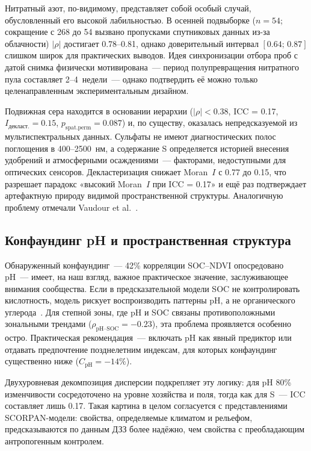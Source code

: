 Нитратный азот, по-видимому, представляет собой особый случай, обусловленный его высокой лабильностью. В осенней подвыборке ($n = 54$; сокращение с 268 до 54 вызвано пропусками спутниковых данных из-за облачности) $|\rho|$ достигает 0.78--0.81, однако доверительный интервал $[0.64;\, 0.87]$ слишком широк для практических выводов. Идея синхронизации отбора проб с датой снимка физически мотивирована~--- период полупревращения нитратного пула составляет 2--4~недели~--- однако подтвердить её можно только целенаправленным экспериментальным дизайном.

Подвижная сера находится в основании иерархии ($|\rho| < 0.38$, ICC = 0.17, $I_{\text{декласт.}} = 0.15$, $p_{\text{spat.perm}} = 0.087$) и, по существу, оказалась непредсказуемой из мультиспектральных данных. Сульфаты не имеют диагностических полос поглощения в 400--2500~нм, а содержание S определяется историей внесения удобрений и атмосферными осаждениями~--- факторами, недоступными для оптических сенсоров. Декластеризация снижает Moran~$I$ с 0.77 до 0.15, что разрешает парадокс «высокий Moran~$I$ при ICC = 0.17» и ещё раз подтверждает артефактную природу видимой пространственной структуры. Аналогичную проблему отмечали Vaudour et al.~\citep{Vaudour2019}.

\subsection{Конфаундинг pH и пространственная структура}

Обнаруженный конфаундинг~--- 42\% корреляции SOC--NDVI опосредовано pH~--- имеет, на наш взгляд, важное практическое значение, заслуживающее внимания сообщества. Если в предсказательной модели SOC не контролировать кислотность, модель рискует воспроизводить паттерны pH, а не органического углерода~\citep{Roberts2017}. Для степной зоны, где pH и SOC связаны противоположными зональными трендами ($\rho_{\text{pH--SOC}} = -0.23$), эта проблема проявляется особенно остро. Практическая рекомендация~--- включать pH как явный предиктор или отдавать предпочтение позднелетним индексам, для которых конфаундинг существенно ниже ($C_{\text{pH}} = -14\%$).

Двухуровневая декомпозиция дисперсии подкрепляет эту логику: для pH 80\% изменчивости сосредоточено на уровне хозяйства и поля, тогда как для S~--- ICC составляет лишь 0.17. Такая картина в целом согласуется с представлениями SCORPAN-модели: свойства, определяемые климатом и рельефом, предсказываются по данным ДЗЗ более надёжно, чем свойства с преобладающим антропогенным контролем.

